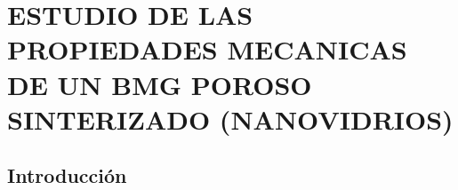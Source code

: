 
\chapter{ESTUDIO DE LAS PROPIEDADES MECANICAS DE UN BMG POROSO SINTERIZADO (NANOVIDRIOS)} %

\label{C5} %




\section{Introducción}
\label{S5_1}




